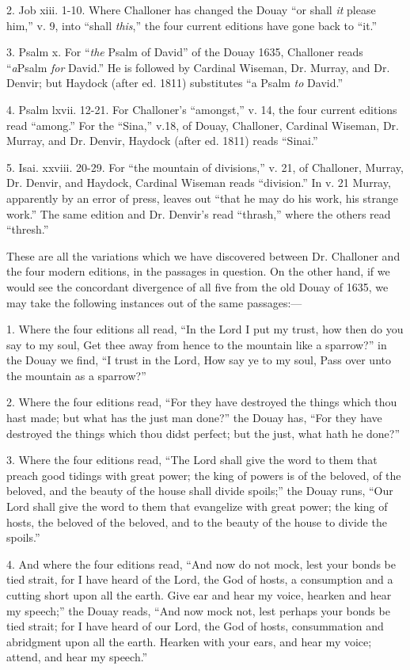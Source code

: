 2. Job xiii. 1-10. Where Challoner has changed the Douay ``or
shall \emph{it} please him,'' v. 9, into ``shall \emph{this},''
the four current editions have gone back to ``it.''

3. Psalm x. For ``\emph{the} Psalm of David'' of the Douay
1635, Challoner reads ``\emph{a}Psalm \emph{for} David.'' He
is followed by Cardinal Wiseman, Dr. Murray, and Dr. Denvir; but
Haydock (after ed. 1811) substitutes ``a Psalm \emph{to}
David.''

4. Psalm lxvii. 12-21. For Challoner's ``amongst,'' v. 14,
the four current editions read ``among.'' For the ``Sina,''
v.18, of Douay, Challoner, Cardinal Wiseman, Dr. Murray, and Dr.
Denvir, Haydock (after ed. 1811) reads ``Sinai.''

5. Isai. xxviii. 20-29. For ``the mountain of divisions,''
v. 21, of Challoner, Murray, Dr. Denvir, and Haydock, Cardinal Wiseman
reads ``division.'' In v. 21 Murray, apparently by an error of
press, leaves out ``that he may do his work, his strange
work.'' The same edition and Dr. Denvir's read ``thrash,''
where the others read ``thresh.''

These are all the variations which we have discovered between Dr.
Challoner and the four modern editions, in the passages in question.
On the other hand, if we would see the concordant divergence of all
five from the old Douay of 1635, we may take the following instances
out of the same passages:—

1. Where the four editions all read, ``In the Lord I put my
trust, how then do you say to my soul, Get thee away from hence to the
mountain like a sparrow?'' in the Douay we find, ``I trust in
the Lord, How say ye to my soul, Pass over unto the mountain as a
sparrow?''

2. Where the four editions read, ``For they have destroyed the
things which thou hast made; but what has the just man done?'' the
Douay has, ``For they have destroyed the things which thou didst
perfect; but the just, what hath he done?''

3. Where the four editions read, ``The Lord shall give the word
to them that preach good tidings with great power; the king of powers
is of the beloved, of the beloved, and the beauty of the house shall
divide spoils;'' the Douay runs, ``Our Lord shall give the
word to them that evangelize with great power; the king of
hosts, the beloved of the beloved, and to the beauty of the house to
divide the spoils.''

4. And where the four editions read, ``And now do not mock,
lest your bonds be tied strait, for I have heard of the Lord, the God
of hosts, a consumption and a cutting short upon all the earth. Give
ear and hear my voice, hearken and hear my speech;'' the Douay
reads, ``And now mock not, lest perhaps your bonds be tied strait;
for I have heard of our Lord, the God of hosts, consummation and
abridgment upon all the earth. Hearken with your ears, and hear my
voice; attend, and hear my speech.''


